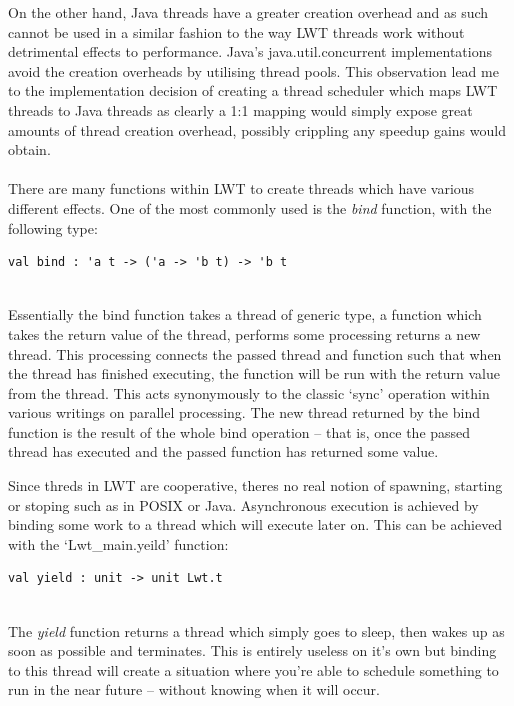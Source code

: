 \documentclass[12pt,twoside,notitlepage]{report}
\begin{document}
On the other hand, Java threads have a greater creation overhead and as such cannot be used in a similar fashion to the way LWT threads work without detrimental effects to performance. Java's java.util.concurrent implementations avoid
the creation overheads by utilising thread pools\cite{web:threadpools}. This observation lead me to the implementation decision of creating a thread scheduler which maps LWT threads to Java threads as clearly a 1:1 mapping would
simply expose great amounts of thread creation overhead, possibly crippling any speedup gains would obtain.
\\
\\
%
%
There are many functions within LWT to create threads which have various different effects. One of the most commonly used is the {\em bind} function, with the following type:
\\
\begin{lstlisting}
val bind : 'a t -> ('a -> 'b t) -> 'b t
\end{lstlisting}
\hfill\\
Essentially the bind function takes a thread of generic type, a function which takes the return value of the thread, performs some processing returns a new thread. This processing connects the passed thread and function such that when
the thread has finished executing, the function will be run with the return value from the thread. This acts synonymously to the classic `sync' operation within various writings on parallel processing\cite{cormen2009}. The new thread
returned by the bind function is the result of the whole bind operation -- that is, once the passed thread has executed and the passed function has returned some value.

Since threds in LWT are cooperative, theres no real notion of spawning, starting or stoping such as in POSIX or Java. Asynchronous execution is achieved by binding some work to a thread which will execute later on. This can be
achieved with the `Lwt\_main.yeild' function:
\\
\begin{lstlisting}
val yield : unit -> unit Lwt.t
\end{lstlisting}
\hfill\\
The {\em yield} function returns a thread which simply goes to sleep, then wakes up as soon as possible and terminates. This is entirely useless on it's own but binding to this thread will create a situation where you're able to
schedule something to run in the near future -- without knowing when it will occur.
\\
\\
\end{document}
